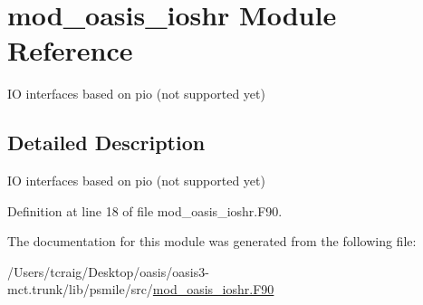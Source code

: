 \hypertarget{classmod__oasis__ioshr}{\section{mod\+\_\+oasis\+\_\+ioshr Module Reference}
\label{classmod__oasis__ioshr}
}


I\+O interfaces based on pio (not supported yet)  




\subsection{Detailed Description}
I\+O interfaces based on pio (not supported yet) 

Definition at line 18 of file mod\+\_\+oasis\+\_\+ioshr.\+F90.



The documentation for this module was generated from the following file\+:\begin{DoxyCompactItemize}
\item 
/\+Users/tcraig/\+Desktop/oasis/oasis3-\/mct.\+trunk/lib/psmile/src/\hyperlink{mod__oasis__ioshr_8_f90}{mod\+\_\+oasis\+\_\+ioshr.\+F90}\end{DoxyCompactItemize}
